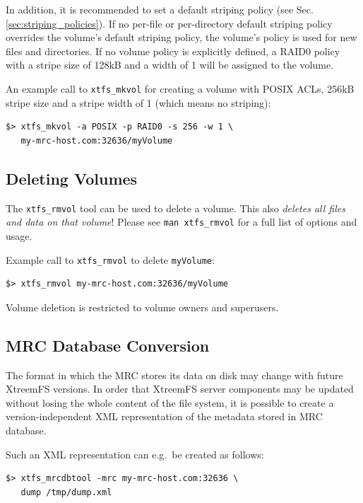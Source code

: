 \documentclass[a4paper,10pt]{book}
\begin{document}
In addition, it is recommended to set a default striping policy (see Sec. \ref{sec:striping_policies}). If no per-file or per-directory default striping policy overrides the volume's default striping policy, the volume's policy is used for new files and directories. If no volume policy is explicitly defined, a RAID0 policy with a stripe size of 128kB and a width of 1 will be assigned to the volume.

An example call to \texttt{xtfs\_mkvol} for creating a volume with POSIX ACLs, 256kB stripe size and a stripe width of 1 (which means no striping):


\begin{verbatim}
$> xtfs_mkvol -a POSIX -p RAID0 -s 256 -w 1 \
   my-mrc-host.com:32636/myVolume
\end{verbatim}

\subsection{Deleting Volumes}

The \texttt{xtfs\_rmvol} tool can be used to delete a volume. This also \emph{deletes all files and data on that volume}! Please see \texttt{man xtfs\_rmvol} for a full list of options and usage.

Example call to \texttt{xtfs\_rmvol} to delete \texttt{myVolume}:


\begin{verbatim}
$> xtfs_rmvol my-mrc-host.com:32636/myVolume
\end{verbatim}

Volume deletion is restricted to volume owners and superusers.

\subsection{MRC Database Conversion}

The format in which the MRC stores its data on disk may change with future XtreemFS versions. In order that XtreemFS server components may be updated without losing the whole content of the file system, it is possible to create a version-independent XML representation of the metadata stored in MRC database.

Such an XML representation can e.g.\ be created as follows:

\begin{verbatim}
$> xtfs_mrcdbtool -mrc my-mrc-host.com:32636 \
   dump /tmp/dump.xml
\end{verbatim}
\end{document}
